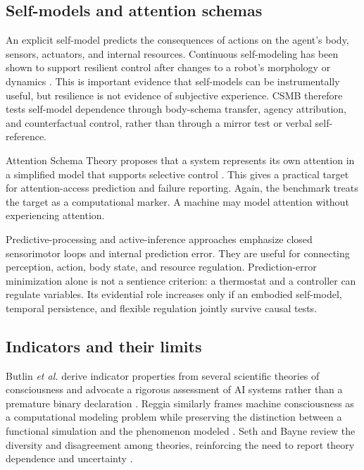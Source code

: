 \documentclass[conference]{IEEEtran}
\begin{document}
\subsection{Self-models and attention schemas}

An explicit self-model predicts the consequences of actions on the agent's body, sensors, actuators, and internal resources. Continuous self-modeling has been shown to support resilient control after changes to a robot's morphology or dynamics \cite{bongard2006}. This is important evidence that self-models can be instrumentally useful, but resilience is not evidence of subjective experience. CSMB therefore tests self-model dependence through body-schema transfer, agency attribution, and counterfactual control, rather than through a mirror test or verbal self-reference.

Attention Schema Theory proposes that a system represents its own attention in a simplified model that supports selective control \cite{graziano2019}. This gives a practical target for attention-access prediction and failure reporting. Again, the benchmark treats the target as a computational marker. A machine may model attention without experiencing attention.

Predictive-processing and active-inference approaches emphasize closed sensorimotor loops and internal prediction error. They are useful for connecting perception, action, body state, and resource regulation. Prediction-error minimization alone is not a sentience criterion: a thermostat and a controller can regulate variables. Its evidential role increases only if an embodied self-model, temporal persistence, and flexible regulation jointly survive causal tests.

\subsection{Indicators and their limits}

Butlin \emph{et al.} derive indicator properties from several scientific theories of consciousness and advocate a rigorous assessment of AI systems rather than a premature binary declaration \cite{butlin2023}. Reggia similarly frames machine consciousness as a computational modeling problem while preserving the distinction between a functional simulation and the phenomenon modeled \cite{reggia2013}. Seth and Bayne review the diversity and disagreement among theories, reinforcing the need to report theory dependence and uncertainty \cite{seth2022}.
\end{document}
